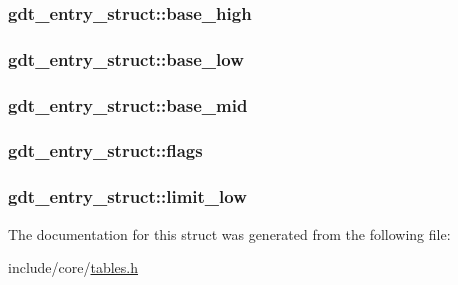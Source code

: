 \subsubsection[{base\+\_\+high}]{ gdt\+\_\+entry\+\_\+struct\+::base\+\_\+high}\label{structgdt__entry__struct_aa03c14867c293012449a3b18a07f45f2}
\hypertarget{structgdt__entry__struct_a90f05cd7f227a34e977a639843a23275}{}
\subsubsection[{base\+\_\+low}]{ gdt\+\_\+entry\+\_\+struct\+::base\+\_\+low}\label{structgdt__entry__struct_a90f05cd7f227a34e977a639843a23275}
\hypertarget{structgdt__entry__struct_a0369f1e190c433425c5b0f40c2070715}{}
\subsubsection[{base\+\_\+mid}]{ gdt\+\_\+entry\+\_\+struct\+::base\+\_\+mid}\label{structgdt__entry__struct_a0369f1e190c433425c5b0f40c2070715}
\hypertarget{structgdt__entry__struct_afac75bdf53080168c8899c442862410a}{}
\subsubsection[{flags}]{ gdt\+\_\+entry\+\_\+struct\+::flags}\label{structgdt__entry__struct_afac75bdf53080168c8899c442862410a}
\hypertarget{structgdt__entry__struct_ada721fbdc3e8d3feae3b07d4b82a37bd}{}
\subsubsection[{limit\+\_\+low}]{ gdt\+\_\+entry\+\_\+struct\+::limit\+\_\+low}\label{structgdt__entry__struct_ada721fbdc3e8d3feae3b07d4b82a37bd}


The documentation for this struct was generated from the following file\+:\begin{DoxyCompactItemize}
\item 
include/core/\hyperlink{tables_8h}{tables.\+h}\end{DoxyCompactItemize}
